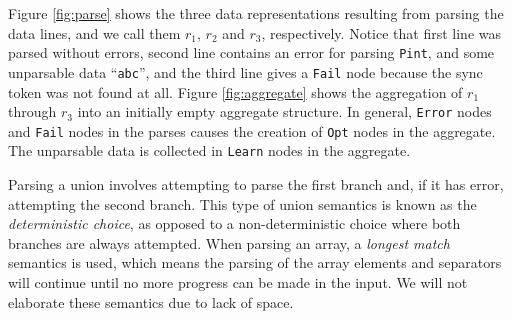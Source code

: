Figure \ref{fig:parse} shows the three data representations resulting from parsing the data lines,
and we call them $r_1$, $r_2$ and $r_3$, respectively. Notice that first line was parsed
without errors, second line contains an error for parsing {\tt Pint}, and some unparsable data
``{\tt abc}'', and the third line gives a {\tt Fail} node because the sync token was not found
at all. 
Figure \ref{fig:aggregate} shows the aggregation of $r_1$ through $r_3$ into an initially empty
aggregate structure. In general, {\tt Error} nodes and {\tt Fail} nodes in the parses causes the
creation of {\tt Opt} nodes in the aggregate. The unparsable data is collected in {\tt Learn} nodes
in the aggregate. 

Parsing a union involves attempting to parse the first branch and, 
if it has error, attempting the second branch. This type of union semantics 
is known as the {\em deterministic choice}, as opposed to a non-deterministic
choice where both branches are always attempted. 
When parsing an array, a {\em longest match} semantics is used, 
which means the parsing of the array elements and separators will 
continue until no more progress can be made in
the input. We will not elaborate these semantics due to lack of space.

%

